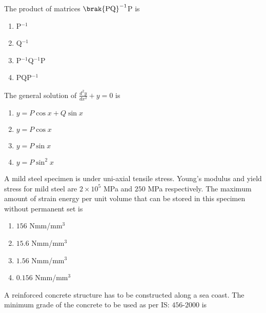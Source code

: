 \iffalse
\author{Manvik Muthyapu - AI24BTECH11021}
\section{ce}
\chapter{2008}
\fi


\item The product of matrices $\brak{\text{PQ}}^{-1}$P is

\begin{enumerate}

	\item P$^{-1}$
	\item Q$^{-1}$
	\item P$^{-1}$Q$^{-1}$P
	\item PQP$^{-1}$

\end{enumerate}

\item The general solution of $\frac{d^2y}{dx^2} + y = 0$ is

\begin{enumerate}
	\item $y = P\cos{x} + Q\sin{x}$
	\item $y = P\cos{x}$
	\item $y = P\sin{x}$
	\item $y = P\sin^2{x}$
\end{enumerate}

\item A mild steel specimen is under uni-axial tensile stress. Young's modulus and yield stress for mild steel are $2\times10^5$ MPa and $250$ MPa respectively. The maximum amount of strain energy per unit volume that can be stored in this specimen without permanent set is

\begin{enumerate}
	\item $156$ Nmm/mm$^3$
	\item $15.6$ Nmm/mm$^3$
	\item $1.56$ Nmm/mm$^3$
	\item $0.156$ Nmm/mm$^3$
\end{enumerate}

\item A reinforced concrete structure has to be constructed along a sea coast. The minimum grade of the concrete to be used as per IS: $456$-$2000$ is

